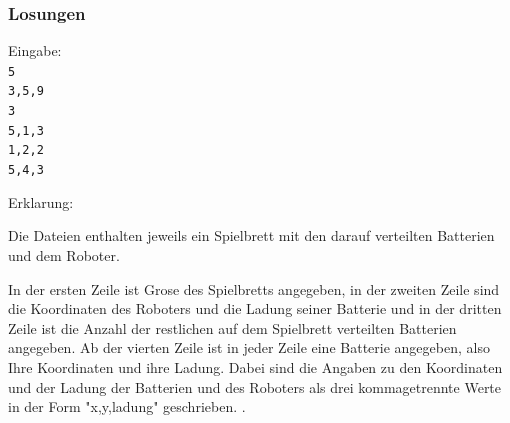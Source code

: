 \documentclass[a4paper,12pt,arial]{scrartcl}
\begin{document}
\newpage
\subsubsection{Losungen}


Eingabe:
\texttt{ \\
5 \\
3,5,9 \\
3 \\
5,1,3 \\
1,2,2 \\
5,4,3 \\
}
\par
Erklarung:

Die Dateien enthalten jeweils ein Spielbrett mit den darauf verteilten Batterien und dem Roboter.

In der ersten Zeile ist Grose des Spielbretts angegeben,
in der zweiten Zeile sind die Koordinaten des Roboters und die Ladung seiner Batterie und
in der dritten Zeile ist die Anzahl der restlichen auf dem Spielbrett verteilten Batterien angegeben.
Ab der vierten Zeile ist in jeder Zeile eine Batterie angegeben, also Ihre Koordinaten und ihre Ladung.
Dabei sind die Angaben zu den Koordinaten und der Ladung der Batterien und des Roboters als drei kommagetrennte Werte in der Form "x,y,ladung" geschrieben.
\textcite{bwinfMaterial}.
\end{document}
